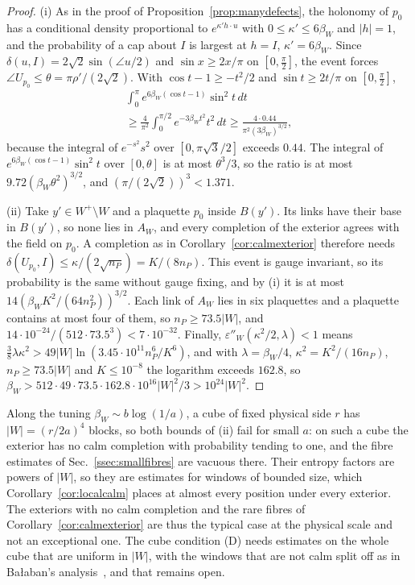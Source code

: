 \documentclass[11pt]{amsart}
\theoremstyle{definition}
\theoremstyle{remark}
\numberwithin{equation}{section}
\begin{document}
\begin{proof}
(i) As in the proof of Proposition~\ref{prop:manydefects}, the holonomy of
$p_0$ has a conditional density proportional to $e^{\kappa'h\cdot u}$ with
$0\le\kappa'\le6\beta_W$ and $|h|=1$, and the probability of a cap about $I$
is largest at $h=I$, $\kappa'=6\beta_W$. Since $\delta(u,I)=2\sqrt2\sin(
\angle u/2)$ and $\sin x\ge2x/\pi$ on $[0,\frac\pi2]$, the event forces
$\angle U_{p_0}\le\theta=\pi\rho'/(2\sqrt2)$. With $\cos t-1\ge-t^2/2$ and
$\sin t\ge2t/\pi$ on $[0,\frac\pi2]$,
\begin{multline*}
\int_0^\pi e^{6\beta_W(\cos t-1)}\sin^2t\,dt\\
\ge\frac4{\pi^2}\int_0^{\pi/2}e^{-3\beta_Wt^2}t^2\,dt\ge\frac{4\cdot0.44}
{\pi^2(3\beta_W)^{3/2}},
\end{multline*}
because the integral of $e^{-s^2}s^2$ over $[0,\pi\sqrt3/2]$ exceeds $0.44$.
The integral of $e^{6\beta_W(\cos t-1)}\sin^2t$ over $[0,\theta]$ is at
most $\theta^3/3$, so the ratio is at most
$9.72(\beta_W\theta^2)^{3/2}$, and $(\pi/(2\sqrt2))^3<1.371$.

(ii) Take $y'\in W^+\setminus W$ and a plaquette $p_0$ inside $B(y')$. Its
links have their base in $B(y')$, so none lies in $A_W$, and every
completion of the exterior agrees with the field on $p_0$. A completion as in
Corollary~\ref{cor:calmexterior} therefore needs $\delta(U_{p_0},I)\le
\kappa/(2\sqrt{n_P})=K/(8n_P)$. This event is gauge invariant, so its
probability is the same without gauge fixing, and by (i) it is at most
$14(\beta_WK^2/(64n_P^2))^{3/2}$. Each link of $A_W$ lies in six plaquettes
and a plaquette contains at most four of them, so $n_P\ge73.5|W|$, and
$14\cdot10^{-24}/(512\cdot73.5^3)<7\cdot10^{-32}$. Finally,
$\varepsilon''_W(\kappa^2/2,\lambda)<1$ means $\frac38\lambda\kappa^2>49|W|
\ln(3.45\cdot10^{11}n_P^6/K^6)$, and with $\lambda=\beta_W/4$, $\kappa^2=
K^2/(16n_P)$, $n_P\ge73.5|W|$ and $K\le10^{-8}$ the logarithm exceeds $162.8$,
so $\beta_W>512\cdot49\cdot73.5\cdot162.8\cdot10^{16}|W|^2/3>10^{24}|W|^2$.
\end{proof}

Along the tuning $\beta_W\sim b\log(1/a)$, a cube of fixed physical side $r$
has $|W|=(r/2a)^4$ blocks, so both bounds of (ii) fail for small $a$: on such
a cube the exterior has no calm completion with probability tending to one,
and the fibre estimates of Sec.~\ref{ssec:smallfibres} are vacuous there.
Their entropy factors are powers of $|W|$, so they are estimates for windows
of bounded size, which Corollary~\ref{cor:localcalm} places at almost every
position under every exterior. The exteriors with no calm completion and the
rare fibres of Corollary~\ref{cor:calmexterior} are thus the typical case at
the physical scale and not an exceptional one. The cube condition (D) needs
estimates on the whole cube that are uniform in $|W|$, with the windows that
are not calm split off as in Ba{\l}aban's analysis~\cite{Bal89b}, and that
remains open.
\end{document}
